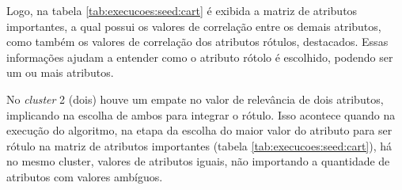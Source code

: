 Logo, na tabela \ref{tab:execucoes:seed:cart} é exibida a matriz de atributos importantes, a qual possui os valores de correlação entre os demais atributos, como também os valores de correlação dos atributos rótulos, destacados. Essas informações ajudam a entender como o atributo rótolo é escolhido, podendo ser um ou mais atributos. 
\begin{table}[!h]
\centering
\caption{Matriz de Atributos Importantes do algoritmo CART na base Seeds}
\label{tab:execucoes:seed:cart}
\end{table}   

No \textit{cluster} 2 (dois) houve um empate no valor de relevância de dois atributos, implicando na escolha de ambos para integrar o rótulo. Isso acontece quando na execução do algoritmo, na etapa da escolha do maior valor do atributo para ser rótulo na matriz de atributos importantes (tabela \ref{tab:execucoes:seed:cart}), há no mesmo cluster, valores de atributos iguais, não importando a quantidade de atributos com valores ambíguos. 
 
